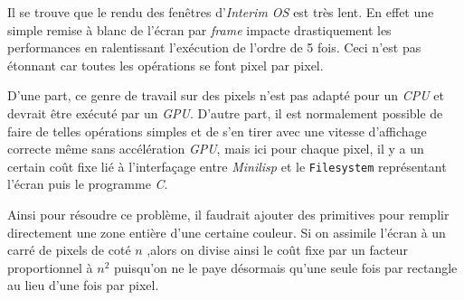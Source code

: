 \documentclass[a4paper, 10pt, french]{article}
\newcommand{\codeC}[1]{\texttt{#1}}
\newcommand{\foreign}[1]{\emph{#1}}
\begin{document}
Il se trouve que le rendu des fenêtres d'\foreign{Interim OS} est très lent. En effet une simple remise à blanc de l'écran par \foreign{frame} impacte drastiquement les performances en ralentissant l'exécution de l'ordre de 5 fois. Ceci n'est pas étonnant car toutes les opérations se font pixel par pixel. 

D'une part, ce genre de travail sur des pixels n'est pas adapté pour un \foreign{CPU} et devrait être exécuté par un \foreign{GPU}. D'autre part, il est normalement possible de faire de telles opérations simples et de s'en tirer avec une vitesse d'affichage correcte même sans accélération \foreign{GPU}, mais ici pour chaque pixel, il y a un certain coût fixe lié à l'interfaçage entre \foreign{Minilisp} et le \codeC{Filesystem} représentant l'écran puis le programme \foreign{C}. 

Ainsi pour résoudre ce problème, il faudrait ajouter des primitives pour remplir directement une zone entière d'une certaine couleur. Si on assimile l'écran à un carré de pixels de coté $n$ ,alors on divise ainsi le coût fixe par un facteur proportionnel à $n^2$ puisqu'on ne le paye désormais qu'une seule fois par rectangle au lieu d'une fois par pixel.
\end{document}
